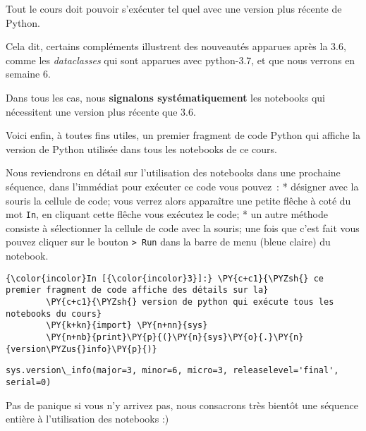     Tout le cours doit pouvoir s'exécuter tel quel avec une version plus
récente de Python.

Cela dit, certains compléments illustrent des nouveautés apparues après
la 3.6, comme les \emph{dataclasses} qui sont apparues avec python-3.7,
et que nous verrons en semaine 6.

Dans tous les cas, nous \textbf{signalons systématiquement} les
notebooks qui nécessitent une version plus récente que 3.6.

    Voici enfin, à toutes fins utiles, un premier fragment de code Python
qui affiche la version de Python utilisée dans tous les notebooks de ce
cours.

Nous reviendrons en détail sur l'utilisation des notebooks dans une
prochaine séquence, dans l'immédiat pour exécuter ce code vous pouvez~:
* désigner avec la souris la cellule de code; vous verrez alors
apparaître une petite flêche à coté du mot \texttt{In}, en cliquant
cette flêche vous exécutez le code; * un autre méthode consiste à
sélectionner la cellule de code avec la souris; une fois que c'est fait
vous pouvez cliquer sur le bouton \texttt{\textgreater{}\textbar{}\ Run}
dans la barre de menu (bleue claire) du notebook.

    \begin{Verbatim}[commandchars=\\\{\}]
{\color{incolor}In [{\color{incolor}3}]:} \PY{c+c1}{\PYZsh{} ce premier fragment de code affiche des détails sur la}
        \PY{c+c1}{\PYZsh{} version de python qui exécute tous les notebooks du cours}
        \PY{k+kn}{import} \PY{n+nn}{sys}
        \PY{n+nb}{print}\PY{p}{(}\PY{n}{sys}\PY{o}{.}\PY{n}{version\PYZus{}info}\PY{p}{)}
\end{Verbatim}


    \begin{Verbatim}[commandchars=\\\{\}]
sys.version\_info(major=3, minor=6, micro=3, releaselevel='final', serial=0)

    \end{Verbatim}

    Pas de panique si vous n'y arrivez pas, nous consacrons très bientôt une
séquence entière à l'utilisation des notebooks :)